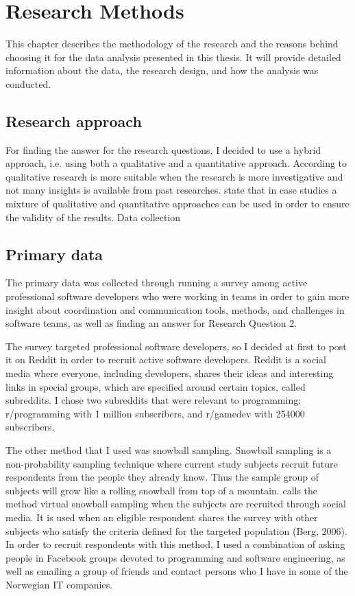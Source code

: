 \chapter{Research Methods}
This chapter describes the methodology of the research and the reasons behind choosing it for the data analysis presented in this thesis. It will provide detailed information about the data, the research design, and how the analysis was conducted.

\section{Research approach}
For finding the answer for the research questions, I decided to use a hybrid approach, i.e. using both a qualitative and a quantitative approach. According to \citet{Ghauri2010} qualitative research is more suitable when the research is more investigative and not many insights is available from past researches. 
\citet{ Stray2012a} state that in case studies a mixture of qualitative and quantitative approaches can be used in order to ensure the validity of the results.  
Data collection

\section{Primary data}
The primary data was collected through running a survey among active professional software developers who were working in teams in order to gain more insight about coordination and communication tools, methods, and challenges in software teams, as well as finding an answer for Research Question 2.

The survey targeted professional software developers, so I decided at first to post it on Reddit in order to recruit active software developers. Reddit is a social media where everyone, including developers, shares their ideas and interesting links in special groups, which are specified around certain topics, called subreddits. I chose two subreddits that were relevant to programming; r/programming with 1 million subscribers, and r/gamedev with 254000 subscribers.

The other method that I used was snowball sampling. Snowball sampling is a non-probability sampling technique where current study subjects recruit future respondents from the people they already know. Thus the sample group of subjects will grow like a rolling snowball from top of a mountain. \citet{Baltar2012} calls the method virtual snowball sampling when the subjects are recruited through social media. It is used when an eligible respondent shares the survey with other subjects who satisfy the criteria defined for the targeted population (Berg, 2006). 
In order to recruit respondents with this method, I used a combination of asking people in Facebook groups devoted to programming and software engineering, as well as emailing a group of friends and contact persons who I have in some of the Norwegian IT companies.

